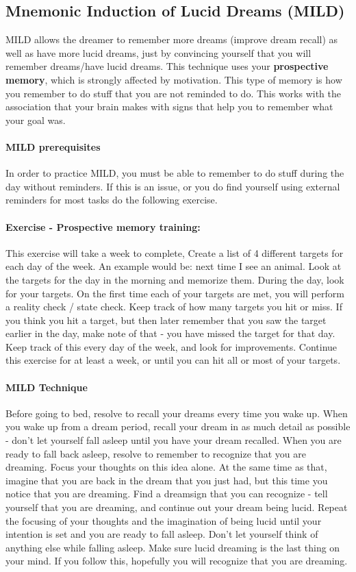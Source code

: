 \documentclass{book}
\begin{document}
\subsection{Mnemonic Induction of Lucid Dreams (MILD)}
MILD allows the dreamer to remember more dreams (improve dream recall) as well as have more lucid dreams, just by convincing yourself that you will remember dreams/have lucid dreams. This technique uses your \textbf{prospective memory}, which is strongly affected by motivation. This type of memory is how you remember to do stuff that you are not reminded to do. This works with the association that your brain makes with signs that help you to remember what your goal was.

\paragraph{MILD prerequisites} In order to practice MILD, you must be able to remember to do stuff during the day without reminders. If this is an issue, or you do find yourself using external reminders for most tasks do the following exercise.

\paragraph{Exercise - Prospective memory training:} This exercise will take a week to complete, Create a list of 4 different targets for each day of the week. An example would be: next time I see an animal. Look at the targets for the day in the morning and memorize them. During the day, look for your targets. On the first time each of your targets are met, you will perform a reality check / state check. Keep track of how many targets you hit or miss. If you think you hit a target, but then later remember that you saw the target earlier in the day, make note of that - you have missed the target for that day. Keep track of this every day of the week, and look for improvements. Continue this exercise for at least a week, or until you can hit all or most of your targets.

\paragraph{MILD Technique} Before going to bed, resolve to recall your dreams every time you wake up. When you wake up from a dream period, recall your dream in as much detail as possible - don't let yourself fall asleep until you have your dream recalled. When you are ready to fall back asleep, resolve to remember to recognize that you are dreaming. Focus your thoughts on this idea alone. At the same time as that, imagine that you are back in the dream that you just had, but this time you notice that you are dreaming. Find a dreamsign that you can recognize - tell yourself that you are dreaming, and continue out your dream being lucid. Repeat the focusing of your thoughts and the imagination of being lucid until your intention is set and you are ready to fall asleep. Don't let yourself think of anything else while falling asleep. Make sure lucid dreaming is the last thing on your mind. If you follow this, hopefully you will recognize that you are dreaming.
\end{document}
